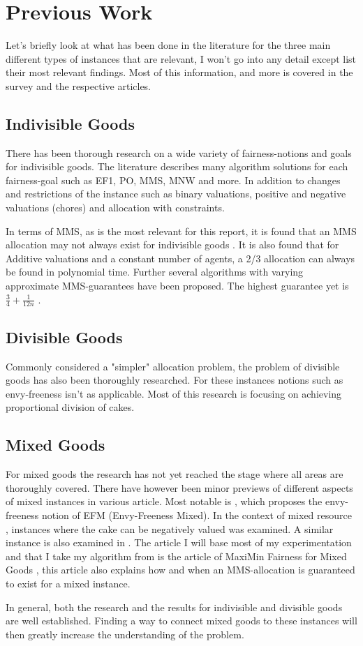\section{Previous Work}\label{sec:previous-work}

Let's briefly look at what has been done in the literature for the three main different types of instances that are relevant, I won't go into any detail except list their most relevant findings. Most of this information, and more is covered in the survey \cite{survey} and the respective articles.


\subsection{Indivisible Goods}\label{subsec:indivisible-goods}

There has been thorough research on a wide variety of fairness-notions and goals for indivisible goods. The literature describes many algorithm solutions for each fairness-goal such as EF1, PO, MMS, MNW and more. In addition to changes and restrictions of the instance such as binary valuations, positive and negative valuations (chores) and allocation with constraints.

In terms of MMS, as is the most relevant for this report, it is found that an MMS allocation may not always exist for indivisible goods \cite{2-3-mms}. It is also found that for Additive valuations and a constant number of agents, a 2/3 allocation can always be found \cite{2-3-mms} in polynomial time. Further several algorithms with varying approximate MMS-guarantees have been proposed. The highest guarantee yet is $\frac{3}{4}+\frac{1}{12n}$ \cite{best-mms}.

\subsection{Divisible Goods}\label{subsec:divisible-goods}
Commonly considered a "simpler" allocation problem, the problem of divisible goods has also been thoroughly researched. For these instances notions such as envy-freeness isn't as applicable. Most of this research is focusing on achieving proportional division of cakes.




\subsection{Mixed Goods}\label{subsec:mixed-goods}
For mixed goods the research has not yet reached the stage where all areas are thoroughly covered. There have however been minor previews of different aspects of mixed instances in various article. Most notable is \cite{mixed-goods}, which proposes the envy-freeness notion of EFM (Envy-Freeness Mixed). In the context of mixed resource \cite{mixed-resources}, instances where the cake can be negatively valued was examined. A similar instance is also examined in \cite{mixed-manna}. The article I will base most of my experimentation and that I take my algorithm from is the article of MaxiMin Fairness for Mixed Goods \cite{mms}, this article also explains how and when an MMS-allocation is guaranteed to exist for a mixed instance.




In general, both the research and the results for indivisible and divisible goods are well established. Finding a way to connect mixed goods to these instances will then greatly increase the understanding of the problem.